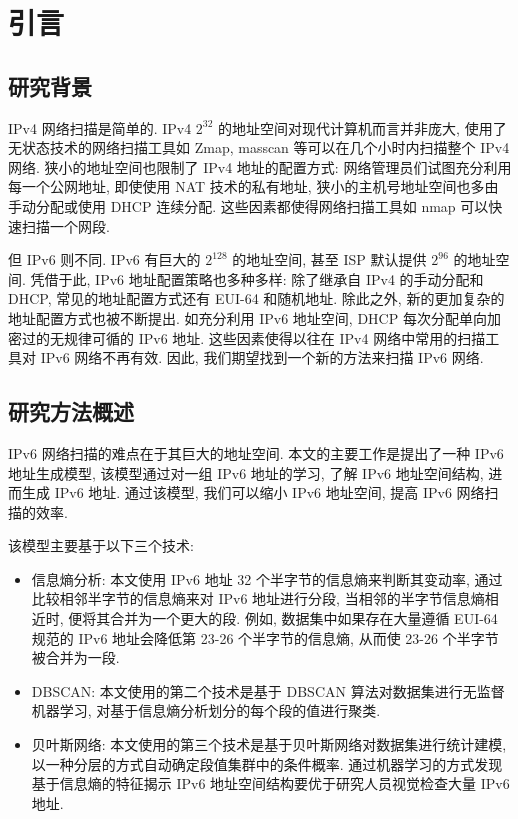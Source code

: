 \chapter{引言}
\label{cha:introduction}

\section{研究背景}

IPv4 网络扫描是简单的. IPv4 $2^{32}$ 的地址空间对现代计算机而言并非庞大, 使用了无状态技术的网络扫描工具如 Zmap, masscan 等可以在几个小时内扫描整个 IPv4 网络. 狭小的地址空间也限制了 IPv4 地址的配置方式: 网络管理员们试图充分利用每一个公网地址, 即使使用 NAT 技术的私有地址, 狭小的主机号地址空间也多由手动分配或使用 DHCP 连续分配. 这些因素都使得网络扫描工具如 nmap 可以快速扫描一个网段.

但 IPv6 则不同. IPv6 有巨大的 $2^{128}$ 的地址空间, 甚至 ISP 默认提供 $2^{96}$ 的地址空间. 凭借于此, IPv6 地址配置策略也多种多样: 除了继承自 IPv4 的手动分配和 DHCP, 常见的地址配置方式还有 EUI-64 和随机地址. 除此之外, 新的更加复杂的地址配置方式也被不断提出. 如充分利用 IPv6 地址空间, DHCP 每次分配单向加密过的无规律可循的 IPv6 地址. 这些因素使得以往在 IPv4 网络中常用的扫描工具对 IPv6 网络不再有效. 因此, 我们期望找到一个新的方法来扫描 IPv6 网络.

\section{研究方法概述}

IPv6 网络扫描的难点在于其巨大的地址空间. 本文的主要工作是提出了一种 IPv6 地址生成模型, 该模型通过对一组 IPv6 地址的学习, 了解 IPv6 地址空间结构, 进而生成 IPv6 地址. 通过该模型, 我们可以缩小 IPv6 地址空间, 提高 IPv6 网络扫描的效率.

该模型主要基于以下三个技术:

\begin{itemize}
\item 信息熵分析: 本文使用 IPv6 地址 32 个半字节的信息熵来判断其变动率, 通过比较相邻半字节的信息熵来对 IPv6 地址进行分段, 当相邻的半字节信息熵相近时, 便将其合并为一个更大的段. 例如, 数据集中如果存在大量遵循 EUI-64 规范的 IPv6 地址会降低第 23-26 个半字节的信息熵, 从而使 23-26 个半字节被合并为一段.
\item DBSCAN: 本文使用的第二个技术是基于 DBSCAN 算法对数据集进行无监督机器学习, 对基于信息熵分析划分的每个段的值进行聚类.
\item 贝叶斯网络: 本文使用的第三个技术是基于贝叶斯网络对数据集进行统计建模, 以一种分层的方式自动确定段值集群中的条件概率. 通过机器学习的方式发现基于信息熵的特征揭示 IPv6 地址空间结构要优于研究人员视觉检查大量 IPv6 地址.
\end{itemize}

